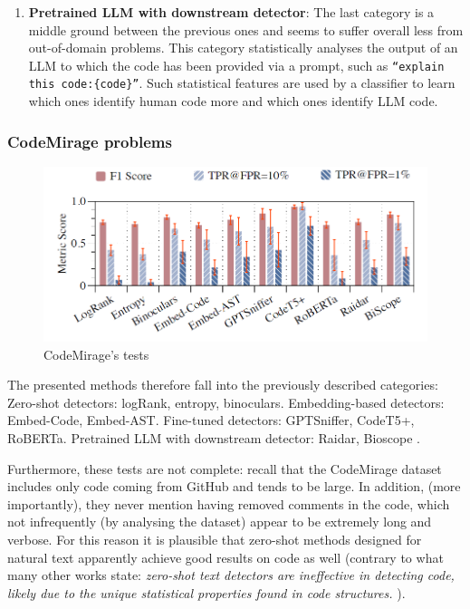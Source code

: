 \begin{enumerate}
    \item \textbf{Pretrained LLM with downstream detector}:
    The last category is a middle ground between the previous ones and seems to 
    suffer overall less from out-of-domain problems. This category statistically 
    analyses the output of an LLM to which the code has been provided via a prompt, 
    such as \texttt{“explain this code:\{code\}”}. Such statistical 
    features are used by a classifier to learn which ones identify 
    human code more and which ones identify 
    LLM code.
\end{enumerate}

\subsubsection{CodeMirage problems}

\begin{figure}[H]
    \centering
    \includegraphics[width=1\textwidth]{img/CodeMirage/tests.png}
    \caption{CodeMirage's tests \cite{guo2025codemirage}}
    \label{fig:CodeMirage-tests}
\end{figure}

The presented methods therefore fall into the previously described categories:
Zero-shot detectors: logRank\cite{gehrmann2019gltr}, entropy\cite{lavergne2008detecting}, 
binoculars\cite{hans2024spotting}.
Embedding-based detectors: Embed-Code, Embed-AST.
Fine-tuned detectors: GPTSniffer\cite{nguyen2024gptsniffer}, CodeT5+\cite{wang2023codet5+}, RoBERTa\cite{liu2019roberta}.
Pretrained LLM with downstream detector: Raidar\cite{mao2024raidar}, Bioscope \cite{guo2024biscope}.


Furthermore, these tests are not complete: 
recall that the CodeMirage dataset includes 
only code coming from GitHub and tends to be 
large. In addition, (more importantly), 
they never mention having removed comments in the code, 
which not infrequently (by analysing the dataset) appear 
to be extremely long and verbose. For this reason it is 
plausible that zero-shot methods designed for natural text 
apparently achieve good results on code as well 
(contrary to what many other works state: 
\textit{ zero-shot text detectors are ineffective in detecting code, 
likely due to the unique statistical properties found in code structures.}
\cite{yang2023zero}
).

